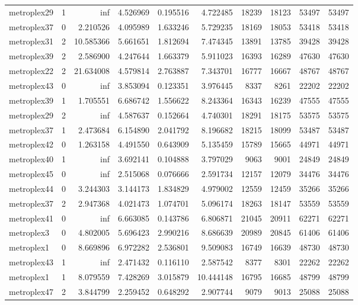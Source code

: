 \begin{longtable}{|l|r|r|r|r|r|r|r|r|r|}
metroplex29 & 1 & inf & 4.526969 & 0.195516 & 4.722485 & 18239 & 18123 & 53497 & 53497 \\
metroplex37 & 0 & 2.210526 & 4.095989 & 1.633246 & 5.729235 & 18169 & 18053 & 53418 & 53418 \\
metroplex31 & 2 & 10.585366 & 5.661651 & 1.812694 & 7.474345 & 13891 & 13785 & 39428 & 39428 \\
metroplex39 & 2 & 2.586900 & 4.247644 & 1.663379 & 5.911023 & 16393 & 16289 & 47630 & 47630 \\
metroplex22 & 2 & 21.634008 & 4.579814 & 2.763887 & 7.343701 & 16777 & 16667 & 48767 & 48767 \\
metroplex43 & 0 & inf & 3.853094 & 0.123351 & 3.976445 & 8337 & 8261 & 22202 & 22202 \\
metroplex39 & 1 & 1.705551 & 6.686742 & 1.556622 & 8.243364 & 16343 & 16239 & 47555 & 47555 \\
metroplex29 & 2 & inf & 4.587637 & 0.152664 & 4.740301 & 18291 & 18175 & 53575 & 53575 \\
metroplex37 & 1 & 2.473684 & 6.154890 & 2.041792 & 8.196682 & 18215 & 18099 & 53487 & 53487 \\
metroplex42 & 0 & 1.263158 & 4.491550 & 0.643909 & 5.135459 & 15789 & 15665 & 44971 & 44971 \\
metroplex40 & 1 & inf & 3.692141 & 0.104888 & 3.797029 & 9063 & 9001 & 24849 & 24849 \\
metroplex45 & 0 & inf & 2.515068 & 0.076666 & 2.591734 & 12157 & 12079 & 34476 & 34476 \\
metroplex44 & 0 & 3.244303 & 3.144173 & 1.834829 & 4.979002 & 12559 & 12459 & 35266 & 35266 \\
metroplex37 & 2 & 2.947368 & 4.021473 & 1.074701 & 5.096174 & 18263 & 18147 & 53559 & 53559 \\
metroplex41 & 0 & inf & 6.663085 & 0.143786 & 6.806871 & 21045 & 20911 & 62271 & 62271 \\
metroplex3 & 0 & 4.802005 & 5.696423 & 2.990216 & 8.686639 & 20989 & 20845 & 61406 & 61406 \\
metroplex1 & 0 & 8.669896 & 6.972282 & 2.536801 & 9.509083 & 16749 & 16639 & 48730 & 48730 \\
metroplex43 & 1 & inf & 2.471432 & 0.116110 & 2.587542 & 8377 & 8301 & 22262 & 22262 \\
metroplex1 & 1 & 8.079559 & 7.428269 & 3.015879 & 10.444148 & 16795 & 16685 & 48799 & 48799 \\
metroplex47 & 2 & 3.844799 & 2.259452 & 0.648292 & 2.907744 & 9079 & 9013 & 25088 & 25088 \\

\end{longtable}
